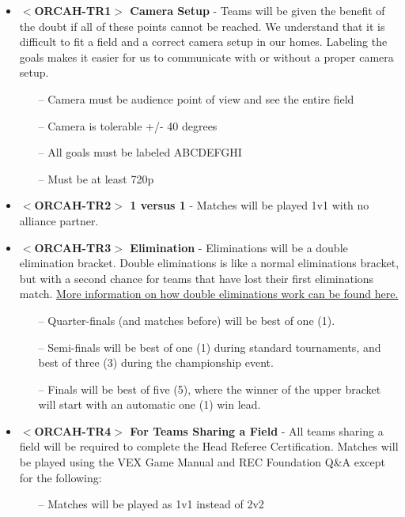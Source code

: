 \documentclass[letterpaper, 12pt]{article}
\begin{document}
\begin{itemize}[label={}]
\item\textbf{$<$ORCAH-TR1$>$ Camera Setup} - Teams will be given the benefit of the doubt if all of these points cannot be reached.  We understand that it is difficult to fit a field and a correct camera setup in our homes.  Labeling the goals makes it easier for us to communicate with or without a proper camera setup.
\begin{itemize}
\item[--] Camera must be audience point of view and see the entire field
\item[--] Camera is tolerable +/- 40 degrees
\item[--] All goals must be labeled ABCDEFGHI
\item[--] Must be at least 720p
\end{itemize}

\item\textbf{$<$ORCAH-TR2$>$ 1 versus 1} - Matches will be played 1v1 with no alliance partner. 

\item\textbf{$<$ORCAH-TR3$>$ Elimination} - Eliminations will be a double elimination bracket.  Double eliminations is like a normal eliminations bracket, but with a second chance for teams that have lost their first eliminations match. \href{https://en.wikipedia.org/wiki/Double-elimination_tournament}{More information on how double eliminations work can be found here.}

\begin{itemize}
\item[--] Quarter-finals (and matches before) will be best of one (1).
\item[--] Semi-finals will be best of one (1) during standard tournaments, and best of three (3) during the championship event.
\item[--] Finals will be best of five (5), where the winner of the upper bracket will start with an automatic one (1) win lead.

\end{itemize}

\item\textbf{$<$ORCAH-TR4$>$ For Teams Sharing a Field} - All teams sharing a field will be required to complete the Head Referee Certification.  Matches will be played using the VEX Game Manual and REC Foundation Q\&A except for the following:
\begin{itemize}
\item[--] Matches will be played as 1v1 instead of 2v2
\end{itemize}



\end{itemize}
\end{document}
